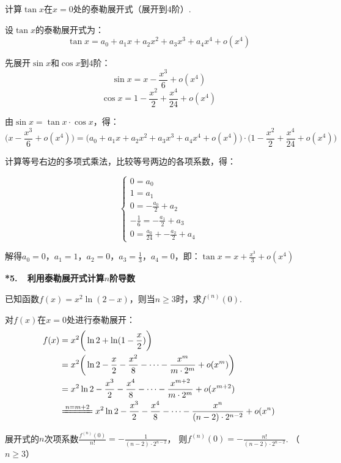 \begin{example}
\label{ex:ch04-07}
计算$\tan x$在$x=0$处的泰勒展开式（展开到$4$阶）.
\end{example}

\begin{solution}
设$\tan x$的泰勒展开式为：
$$
\tan x = a_0 + a_1 x +   a_2 x^2 + a_3 x^3 + a_4 x^4 + o(x^4)
$$\par
先展开$\sin x$和$\cos x$到$4$阶：
$$
\sin x = x - \frac{x^3}{6} + o(x^4)
$$
$$
\cos x = 1 -\frac{x^2}{2} + \frac{x^4}{24} + o(x^4)
$$\par
由$\sin x = \tan x \cdot \cos x$，得：
$$
\bigg( x - \frac{x^3}{6} + o(x^4)  \bigg) = \bigg( a_0 + a_1 x +   a_2 x^2 + a_3 x^3 + a_4 x^4 + o(x^4) \bigg)
\cdot \bigg( 1 -\frac{x^2}{2} + \frac{x^4}{24} + o(x^4)  \bigg)
$$

计算等号右边的多项式乘法，比较等号两边的各项系数，得：

\[
\begin{cases}
    0 = a_0 \\
    1 = a_1 \\
    0 = -\frac{a_0}{2} + a_2 \\
    -\frac{1}{6} = -\frac{a_1}{2} + a_3 \\
    0 = \frac{a_0}{24} + -\frac{a_2}{2} + a_4
\end{cases}
\]

解得$a_0 = 0$，$a_1 = 1$，$a_2 = 0$，$a_3 = \frac{1}{3}$，$a_4 = 0$，即：$\tan x = x + \frac{x^3}{3} + o(x^4)$
\end{solution}

\textbf{*5.~~利用泰勒展开式计算$n$阶导数}

\begin{example}
\label{ex:ch04-08}
已知函数$f(x)=x^2\ln(2-x)$，则当$n \ge 3$时，求$f^{(n)}(0)$.
\end{example}

\begin{solution}
对$f(x)$在$x=0$处进行泰勒展开：
\begin{equation}
    \begin{aligned}
        f(x) &= x^2 \bigg(\ln 2 + \ln(1 - \frac{x}{2}) \bigg) \\
        &= x^2 \bigg( \ln 2 - \frac{x}{2} - \frac{x^2}{8} - \cdots - \frac{x^m}{m \cdot 2^m} + o(x^m) \bigg) \\
        &= x^2 \ln 2 -  \frac{x^3}{2} - \frac{x^4}{8} - \cdots -  \frac{x^{m+2}}{m \cdot 2^m} + o(x^{m+2}) \\
        &\xlongequal{n = m+2} x^2 \ln 2 -  \frac{x^3}{2} - \frac{x^4}{8} - \cdots -  \frac{x^{n}}{(n-2) \cdot 2^{n-2}} + o(x^{n})
        \nonumber
    \end{aligned}
\end{equation} \par
展开式的$n$次项系数$\frac{f^{(n)}(0)}{n!} = -  \frac{1}{(n-2) \cdot 2^{n-2}}$，
则$f^{(n)}(0) = -\frac{n!}{(n-2) \cdot 2^{n-2}}$. （$n \ge 3$）
\end{solution}

